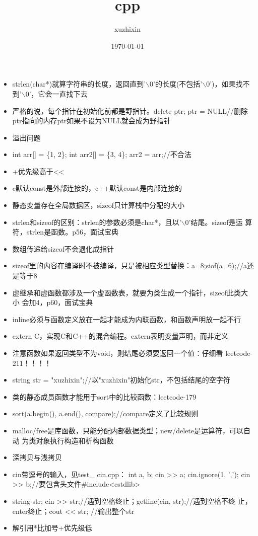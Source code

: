 \documentclass[11pt]{article}
\author{xuzhixin}
\date{\today}
\title{cpp}
\begin{document}
\maketitle
\tableofcontents

\begin{itemize}
\item strlen(char*)就算字符串的长度，返回直到'$\backslash$0'的长度(不包括'$\backslash$0')，如果找不
到'$\backslash$0'，它会一直找下去
\item 严格的说，每个指针在初始化前都是野指针。delete ptr; ptr = NULL//删除
ptr指向的内存ptr如果不设为NULL就会成为野指针
\item 溢出问题
\item int arr[] = \{1, 2\}; int arr2[] = \{3, 4\}; arr2 = arr;//不合法
\item +优先级高于<<
\item c默认const是外部连接的，c++默认const是内部连接的
\item 静态变量存在全局数据区，sizeof只计算栈中分配的大小
\item strlen和sizeof的区别：strlen的参数必须是char*，且以'$\backslash$0'结尾。sizeof是运
算符，strlen是函数。p56，面试宝典
\item 数组传递给sizeof不会退化成指针
\item sizeof里的内容在编译时不被编译，只是被相应类型替换：a=8;siof(a=6);//a还
是等于8
\item 虚继承和虚函数都涉及一个虚函数表，就要为类生成一个指针，sizeof此类大小
会加4，p60，面试宝典
\item inline必须与函数定义放在一起才能成为内联函数，和函数声明放一起不行
\item extern C，实现C和C++的混合编程。extern表明变量声明，而非定义
\item 注意函数如果返回类型不为void，则结尾必须要返回一个值：仔细看
leetcode-211！！！！
\item string str = "xuzhixin";//以"xuzhixin"初始化str，不包括结尾的空字符
\item 类的静态成员函数才能用于sort中的比较函数：leetcode-179
\item sort(a.begin(), a.end(), compare);//compare定义了比较规则
\item malloc/free是库函数，只能分配内部数据类型；new/delete是运算符，可以自动
为类对象执行构造和析构函数
\item 深拷贝与浅拷贝
\item cin带逗号的输入，见test\_ cin.cpp： int a, b; cin >> a; cin.ignore(1,
','); cin >> b;//要包含头文件\#include<cstdlib>
\item string str; cin >> str;//遇到空格终止；getline(cin, str);//遇到空格不终
止，enter终止；cout << str; //输出整个str
\item 解引用*比加号+优先级低
\end{itemize}
\end{document}
